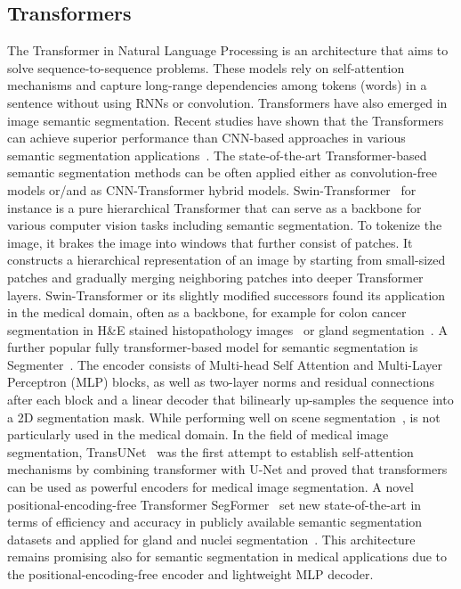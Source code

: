 \subsection{Transformers}
The Transformer in  Natural Language Processing is an architecture that aims to solve
sequence-to-sequence problems.
These models rely on self-attention mechanisms and capture long-range dependencies among tokens
(words) in a sentence without using RNNs or convolution. Transformers have also emerged in image
semantic segmentation. Recent studies have shown that the Transformers can achieve superior performance
than CNN-based approaches in various semantic segmentation applications~\cite{nguyen2022evaluating}.
The state-of-the-art Transformer-based semantic segmentation methods can be often applied either as
convolution-free models or/and as CNN-Transformer hybrid models. Swin-Transformer~\cite{liu2021swin}
for instance is a pure hierarchical Transformer that can serve as a  backbone for various computer
vision tasks including semantic segmentation. To tokenize the image, it brakes the image into windows
that further consist of patches. It constructs a hierarchical representation of an image by starting
from small-sized patches and gradually merging neighboring patches into deeper Transformer layers.
Swin-Transformer or its slightly modified successors found its application in the medical domain,
often as a backbone, for example for colon cancer segmentation in H\&E stained histopathology
images~\cite{qian2022transformer} or gland segmentation~\cite{lin2022ds}. A further popular fully
transformer-based model for semantic segmentation is Segmenter~\cite{strudel2021segmenter}.
The encoder consists of Multi-head Self Attention and Multi-Layer Perceptron (MLP) blocks, as well
as two-layer norms and residual connections after each block and a linear decoder that bilinearly
up-samples the sequence into a 2D segmentation mask. While performing well on scene
segmentation~\cite{strudel2021segmenter}, is not particularly used in the medical domain.
In the field of medical image segmentation, TransUNet~\cite{chen2021transunet} was the first attempt
to establish self-attention mechanisms by combining transformer with U-Net and proved that
transformers can be used as powerful encoders for medical image segmentation.
A novel positional-encoding-free Transformer SegFormer~\cite{xie2021segformer}
set new state-of-the-art in terms of efficiency and accuracy in publicly available semantic segmentation
datasets and applied for gland and nuclei segmentation~\cite{lin2022ds}.
This architecture remains promising also for semantic segmentation in medical
applications due to the positional-encoding-free encoder and lightweight MLP decoder.

